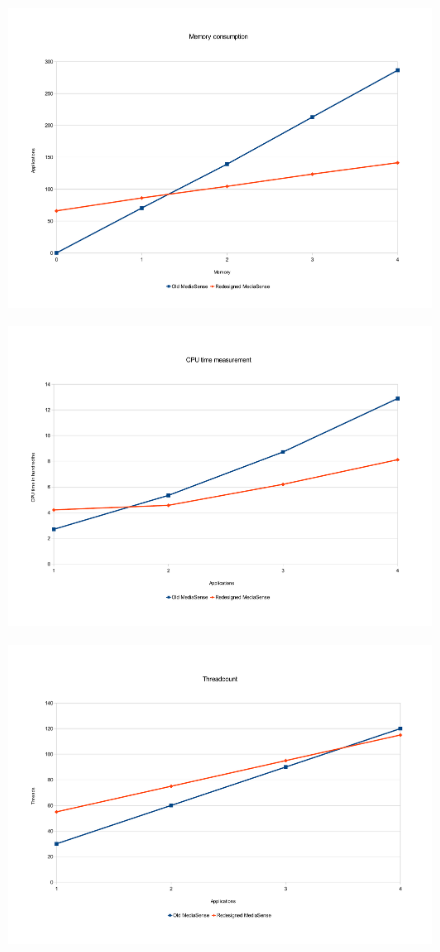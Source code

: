 \begin{figure}[H]
		\centering
    	\includegraphics[scale=0.50]{part_7/test_results/memory.pdf}
\end{figure}

\begin{figure}[H]
		\centering
    	\includegraphics[scale=0.50]{part_7/test_results/cputime.pdf}
\end{figure}

\begin{figure}[H]
		\centering
    	\includegraphics[scale=0.50]{part_7/test_results/threads.pdf}
\end{figure}

